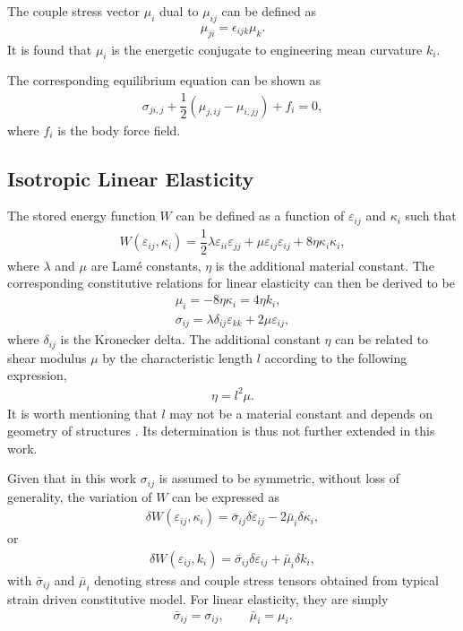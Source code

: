 \documentclass[3p,sort&compress,11pt,fleqn]{elsarticle}
\begin{document}
The couple stress vector $\mu_i$ dual to $\mu_{ij}$ can be defined as
\begin{gather}
\mu_{ji}=\epsilon_{ijk}\mu_k.
\end{gather}
It is found that $\mu_i$ is the energetic conjugate to engineering mean curvature $k_i$.

The corresponding equilibrium equation can be shown as
\begin{gather}\label{eq:equilibrium}
\sigma_{ji,j}+\dfrac{1}{2}\left(\mu_{j,ij}-\mu_{i,jj}\right)+f_i=0,
\end{gather}
where $f_i$ is the body force field.
\subsection{Isotropic Linear Elasticity}
The stored energy function $W$ can be defined as a function of $\varepsilon_{ij}$ and $\kappa_i$ such that
\begin{gather}\label{eq:stored_energy}
W\left(\varepsilon_{ij},\kappa_i\right)=\dfrac{1}{2}\lambda\varepsilon_{ii}\varepsilon_{jj}+\mu\varepsilon_{ij}\varepsilon_{ij}+8\eta\kappa_i\kappa_i,
\end{gather}
where $\lambda$ and $\mu$ are Lam\'{e} constants, $\eta$ is the additional material constant. The corresponding constitutive relations for linear elasticity can then be derived to be
\begin{gather}\label{eq:constitutive_couple}
\mu_i=-8\eta\kappa_i=4\eta{}k_i,\\
\sigma_{ij}=\lambda\delta_{ij}\varepsilon_{kk}+2\mu\varepsilon_{ij},
\end{gather}
where $\delta_{ij}$ is the Kronecker delta. The additional constant $\eta$ can be related to shear modulus $\mu$ by the characteristic length $l$ according to the following expression,
\begin{gather}
\eta=l^2\mu.
\end{gather}
It is worth mentioning that $l$ may not be a material constant and depends on geometry of structures \citep{Khorshidi2018}. Its determination is thus not further extended in this work.

Given that in this work $\sigma_{ij}$ is assumed to be symmetric, without loss of generality, the variation of $W$ can be expressed as
\begin{gather}\label{eq:potential_energy}
\delta{}W\left(\varepsilon_{ij},\kappa_i\right)=\bar{\sigma}_{ij}\delta\varepsilon_{ij}-2\bar{\mu}_{i}\delta\kappa_i,
\end{gather}
or
\begin{gather}
\delta{}W\left(\varepsilon_{ij},k_i\right)=\bar{\sigma}_{ij}\delta\varepsilon_{ij}+\bar{\mu}_{i}\delta{}k_i,
\end{gather}
with $\bar{\sigma}_{ij}$ and $\bar{\mu}_{i}$ denoting stress and couple stress tensors obtained from typical strain driven constitutive model. For linear elasticity, they are simply
\begin{gather*}
\bar{\sigma}_{ij}=\sigma_{ij},\qquad\bar{\mu}_{i}=\mu_{i}.
\end{gather*}
\end{document}
